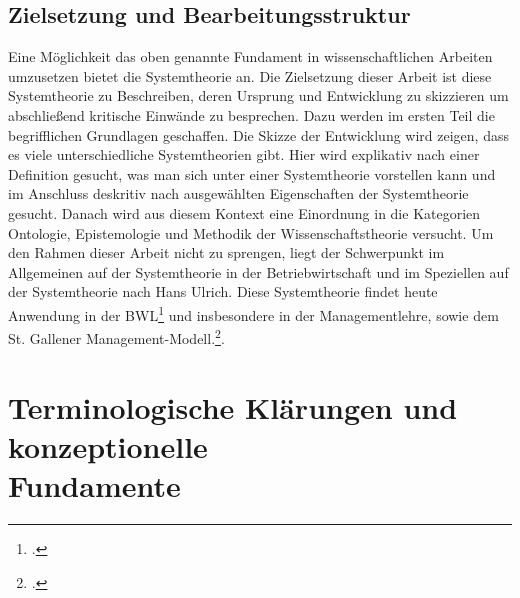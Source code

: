 \documentclass[a4paper,12pt]{article}
\begin{document}
\subsection{Zielsetzung und Bearbeitungsstruktur}
Eine Möglichkeit das oben genannte Fundament in wissenschaftlichen Arbeiten umzusetzen bietet die Systemtheorie an. Die Zielsetzung dieser Arbeit ist diese Systemtheorie zu Beschreiben, deren Ursprung und Entwicklung zu skizzieren um abschließend kritische Einwände zu besprechen. Dazu werden im ersten Teil die begrifflichen Grundlagen geschaffen. Die Skizze der Entwicklung wird zeigen, dass es viele unterschiedliche Systemtheorien gibt. Hier wird explikativ nach einer Definition gesucht, was man sich unter einer Systemtheorie vorstellen kann und im Anschluss deskritiv nach ausgewählten Eigenschaften der Systemtheorie gesucht. Danach wird aus diesem Kontext eine Einordnung in die Kategorien Ontologie, Epistemologie und Methodik der Wissenschaftstheorie versucht. Um den Rahmen dieser Arbeit nicht zu sprengen, liegt der Schwerpunkt im Allgemeinen auf der Systemtheorie in der Betriebwirtschaft und im Speziellen auf der Systemtheorie nach Hans Ulrich. Diese Systemtheorie findet heute Anwendung in der BWL\footcite[S. 26]{Woehe2008} und insbesondere in der Managementlehre, sowie dem St. Gallener Management-Modell.\footcite[S. 10]{RueeggStuerm2020}.



\section{Terminologische Klärungen und konzeptionelle\\ Fundamente}
\end{document}
